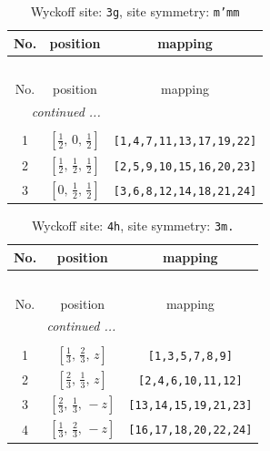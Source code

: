 \documentclass[fleqn,8pt]{jsarticle}
\begin{document}
\begin{longtable}{ccc}
\caption{Wyckoff site: {\tt 3g}, site symmetry: {\tt m'mm}}
 \\
 \hline \hline
No. & position & mapping \\ \hline \endfirsthead

\multicolumn{2}{l}{\tablename\ \thetable{}} \\
 \hline \hline
No. & position & mapping \\ \hline \endhead

 \hline \hline
\multicolumn{2}{r}{\footnotesize\it continued ...} \\ \endfoot

 \hline \hline
\multicolumn{2}{r}{} \\ \endlastfoot

1 & $\left[ \frac{1}{2},\, 0,\, \frac{1}{2} \right]$ & {\tt [1,4,7,11,13,17,19,22]} \\ \hline
2 & $\left[ \frac{1}{2},\, \frac{1}{2},\, \frac{1}{2} \right]$ & {\tt [2,5,9,10,15,16,20,23]} \\ \hline
3 & $\left[ 0,\, \frac{1}{2},\, \frac{1}{2} \right]$ & {\tt [3,6,8,12,14,18,21,24]} \\
\end{longtable}
\renewcommand{\arraystretch}{1.2}
\begin{longtable}{ccc}
\caption{Wyckoff site: {\tt 4h}, site symmetry: {\tt 3m.}}
 \\
 \hline \hline
No. & position & mapping \\ \hline \endfirsthead

\multicolumn{2}{l}{\tablename\ \thetable{}} \\
 \hline \hline
No. & position & mapping \\ \hline \endhead

 \hline \hline
\multicolumn{2}{r}{\footnotesize\it continued ...} \\ \endfoot

 \hline \hline
\multicolumn{2}{r}{} \\ \endlastfoot

1 & $\left[ \frac{1}{3},\, \frac{2}{3},\, z \right]$ & {\tt [1,3,5,7,8,9]} \\ \hline
2 & $\left[ \frac{2}{3},\, \frac{1}{3},\, z \right]$ & {\tt [2,4,6,10,11,12]} \\ \hline
3 & $\left[ \frac{2}{3},\, \frac{1}{3},\, - z \right]$ & {\tt [13,14,15,19,21,23]} \\ \hline
4 & $\left[ \frac{1}{3},\, \frac{2}{3},\, - z \right]$ & {\tt [16,17,18,20,22,24]} \\
\end{longtable}
\end{document}
